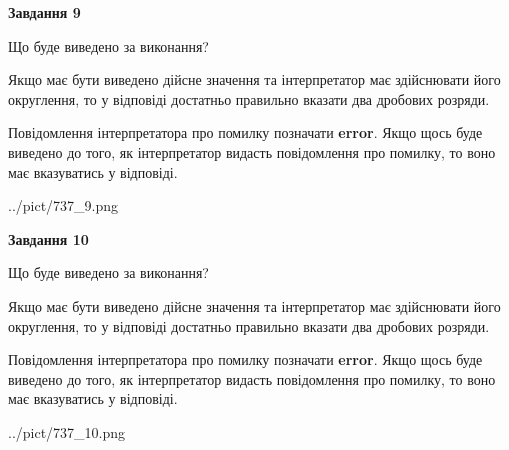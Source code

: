 \documentclass[12pt, ukrainian]{article}
\begin{document}
{\begin {Large}
{\begin {center}\textbf{Завдання 9}\end {center}}\par
Що буде виведено за виконання? \par

Якщо має бути виведено дійсне значення та інтерпретатор має здійснювати його округлення, 
то у відповіді достатньо правильно вказати два дробових розряди.

Повідомлення інтерпретатора про помилку позначати \textbf{error}.
Якщо щось буде виведено до того, як інтерпретатор видасть повідомлення про помилку, 
то воно має вказуватись у відповіді. \par

\begin{center}
	{../pict/737_9.png}
\end{center}
\newpage

{\begin {center}\textbf{Завдання 10}\end {center}}\par
Що буде виведено за виконання? \par

Якщо має бути виведено дійсне значення та інтерпретатор має здійснювати його округлення, 
то у відповіді достатньо правильно вказати два дробових розряди.

Повідомлення інтерпретатора про помилку позначати \textbf{error}.
Якщо щось буде виведено до того, як інтерпретатор видасть повідомлення про помилку, 
то воно має вказуватись у відповіді. \par

\begin{center}
	{../pict/737_10.png}
\end{center}
\newpage

\end {Large}}
\end{document}
